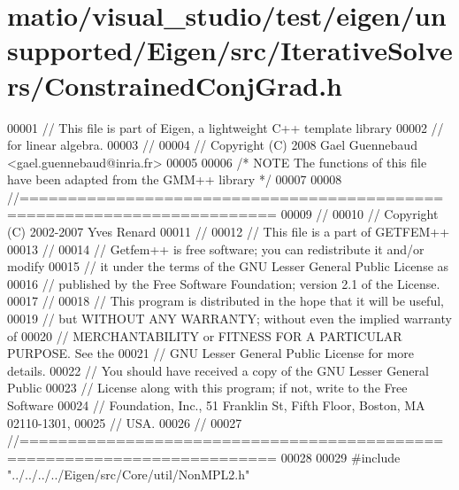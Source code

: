 \hypertarget{matio_2visual__studio_2test_2eigen_2unsupported_2_eigen_2src_2_iterative_solvers_2_constrained_conj_grad_8h_source}{}\section{matio/visual\+\_\+studio/test/eigen/unsupported/\+Eigen/src/\+Iterative\+Solvers/\+Constrained\+Conj\+Grad.h}
\label{matio_2visual__studio_2test_2eigen_2unsupported_2_eigen_2src_2_iterative_solvers_2_constrained_conj_grad_8h_source}

\begin{DoxyCode}
00001 \textcolor{comment}{// This file is part of Eigen, a lightweight C++ template library}
00002 \textcolor{comment}{// for linear algebra.}
00003 \textcolor{comment}{//}
00004 \textcolor{comment}{// Copyright (C) 2008 Gael Guennebaud <gael.guennebaud@inria.fr>}
00005 
00006 \textcolor{comment}{/* NOTE The functions of this file have been adapted from the GMM++ library */}
00007 
00008 \textcolor{comment}{//========================================================================}
00009 \textcolor{comment}{//}
00010 \textcolor{comment}{// Copyright (C) 2002-2007 Yves Renard}
00011 \textcolor{comment}{//}
00012 \textcolor{comment}{// This file is a part of GETFEM++}
00013 \textcolor{comment}{//}
00014 \textcolor{comment}{// Getfem++ is free software; you can redistribute it and/or modify}
00015 \textcolor{comment}{// it under the terms of the GNU Lesser General Public License as}
00016 \textcolor{comment}{// published by the Free Software Foundation; version 2.1 of the License.}
00017 \textcolor{comment}{//}
00018 \textcolor{comment}{// This program is distributed in the hope that it will be useful,}
00019 \textcolor{comment}{// but WITHOUT ANY WARRANTY; without even the implied warranty of}
00020 \textcolor{comment}{// MERCHANTABILITY or FITNESS FOR A PARTICULAR PURPOSE.  See the}
00021 \textcolor{comment}{// GNU Lesser General Public License for more details.}
00022 \textcolor{comment}{// You should have received a copy of the GNU Lesser General Public}
00023 \textcolor{comment}{// License along with this program; if not, write to the Free Software}
00024 \textcolor{comment}{// Foundation, Inc., 51 Franklin St, Fifth Floor, Boston, MA  02110-1301,}
00025 \textcolor{comment}{// USA.}
00026 \textcolor{comment}{//}
00027 \textcolor{comment}{//========================================================================}
00028 
00029 \textcolor{preprocessor}{#include "../../../../Eigen/src/Core/util/NonMPL2.h"}

\end{DoxyCode}
